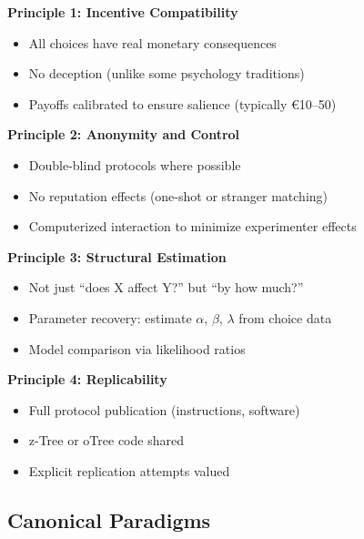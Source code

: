 \documentclass[11pt, a4paper]{article}
\begin{document}
\begin{tcolorbox}[colback=green!5!white, colframe=green!75!black,
    title=European Laboratory Standard: Core Principles]

\textbf{Principle 1: Incentive Compatibility}
\begin{itemize}[nosep]
    \item All choices have real monetary consequences
    \item No deception (unlike some psychology traditions)
    \item Payoffs calibrated to ensure salience (typically €10--50)
\end{itemize}

\textbf{Principle 2: Anonymity and Control}
\begin{itemize}[nosep]
    \item Double-blind protocols where possible
    \item No reputation effects (one-shot or stranger matching)
    \item Computerized interaction to minimize experimenter effects
\end{itemize}

\textbf{Principle 3: Structural Estimation}
\begin{itemize}[nosep]
    \item Not just ``does X affect Y?'' but ``by how much?''
    \item Parameter recovery: estimate $\alpha$, $\beta$, $\lambda$ from choice data
    \item Model comparison via likelihood ratios
\end{itemize}

\textbf{Principle 4: Replicability}
\begin{itemize}[nosep]
    \item Full protocol publication (instructions, software)
    \item z-Tree or oTree code shared
    \item Explicit replication attempts valued
\end{itemize}

\end{tcolorbox}

\subsection{Canonical Paradigms}
\end{document}

